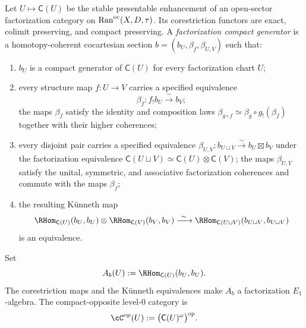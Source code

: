\begin{definition}
\label{def:mr-factorization-compact-generator}
Let $U\mapsto\mathsf C(U)$ be the stable presentable enhancement of an
open-sector factorization category on
$\mathrm{Ran}^{\mathrm{oc}}(X,D,\tau)$.  Its corestriction functors are exact,
colimit preserving, and compact preserving.  A \emph{factorization
compact generator} is a
homotopy-coherent cocartesian section
$b=(b_U,\beta_f,\beta_{U,V})$ such that:
\begin{enumerate}[label=\textup{(\roman*)}]
\item $b_U$ is a compact generator of $\mathsf C(U)$ for every
factorization chart $U$;
\item every structure map $f\colon U\to V$ carries a specified
equivalence
\[
 \beta_f\colon f_!b_U\xrightarrow{\ \sim\ }b_V;
\]
the maps $\beta_f$ satisfy the identity and composition laws
$\beta_{g\circ f}\simeq
\beta_g\circ g_!(\beta_f)$ together with their higher coherences;
\item every disjoint pair carries a specified equivalence
$\beta_{U,V}\colon
b_{U\sqcup V}\xrightarrow{\sim}b_U\boxtimes b_V$ under the factorization
equivalence
$\mathsf C(U\sqcup V)\simeq\mathsf C(U)\otimes\mathsf C(V)$;
the maps $\beta_{U,V}$ satisfy the unital, symmetric, and associative
factorization coherences and commute with the maps $\beta_f$;
\item the resulting K\"unneth map
\[
 \RHom_{\mathsf C(U)}(b_U,b_U)\otimes
 \RHom_{\mathsf C(V)}(b_V,b_V)
 \xrightarrow{\ \sim\ }
 \RHom_{\mathsf C(U\sqcup V)}(b_{U\sqcup V},b_{U\sqcup V})
\]
is an equivalence.
\end{enumerate}
Set
\[
 A_b(U):=\RHom_{\mathsf C(U)}(b_U,b_U).
\]
The corestriction maps and the K\"unneth equivalences make $A_b$ a
factorization $E_1$-algebra.  The compact-opposite level-$0$ category
is
\[
 \cC^\op(U):=\bigl(\mathsf C(U)^\omega\bigr)^\op .
\]
\end{definition}

